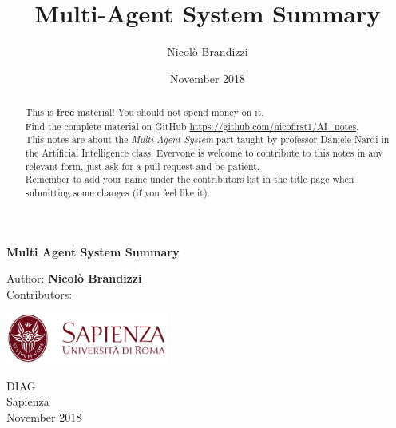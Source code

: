 \documentclass[10pt,a4paper]{article}
\author{Nicolò Brandizzi}
\title{Multi-Agent System Summary}
\date{November 2018}
\begin{document}
\begin{titlepage}
    \begin{center}
        \vspace*{1cm}
        
        \Huge
        \textbf{Multi Agent System Summary}
        
        
        \vspace{1.5cm}
        
        Author:
        \textbf{Nicolò Brandizzi}\\
        \vspace{0.5cm}
        \Large
        Contributors:
        \textbf{}%
        
        \vfill
        
        \includegraphics[width=0.4\textwidth]{images/sapienza_logo.jpg}


        
        \vfill
        
  

        \vspace{0.8cm}
        
        
        \Large
        DIAG\\
        Sapienza\\
        November 2018

    \end{center}
\end{titlepage}


\tableofcontents
\newpage
\begin{abstract}
This is \textbf{free} material! You should not spend money on it.\\
Find the complete material on GitHub \url{https://github.com/nicofirst1/AI_notes}.\\

This notes are about the \textit{Multi Agent System} part taught by professor Daniele Nardi in the Artificial Intelligence class. Everyone is welcome to contribute to this notes in any relevant form, just ask for a pull request and be patient.\\ Remember to add your name under the contributors list in the title page when submitting some changes (if you feel like it).
\end{abstract}
\end{document}
